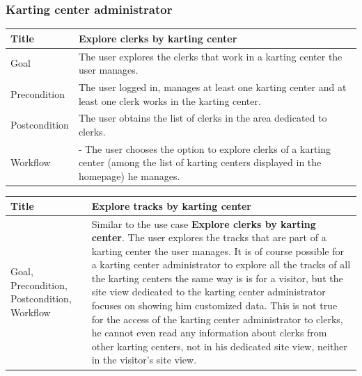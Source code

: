 \documentclass{beamer}
\begin{document}
\begin{frame}
    \frametitle{Karting center administrator}
    \begin{table}
        \tiny
        \begin{tabular}{|p{2cm}|p{6cm}|}
        \hline  
        Title & \textbf{Explore clerks by karting center} \\
        \hline
        Goal & The user explores the clerks that work in a karting center the user manages. \\
        \hline
        Precondition & The user logged in, manages at least one karting center and at least one clerk
        works in the karting center.\\
        \hline
        Postcondition & The user obtains the list of clerks in the area dedicated to clerks. \\
        \hline
        Workflow &
        - The user chooses the option to explore clerks of a karting center 
        (among the list of karting centers displayed in the homepage) he manages. \\
        \hline
        \end{tabular}
\end{table}

\begin{table}
    \tiny
    \begin{tabular}{|p{2cm}|p{6cm}|}
    \hline  
    Title & \textbf{Explore tracks by karting center} \\
    \hline
    Goal, Precondition, Postcondition, Workflow & Similar to the use case \textbf{Explore clerks by karting center}.
    The user explores the tracks that are part of a karting center the user manages. It is of course
    possible for a karting center administrator to explore all the tracks of all the karting centers
    the same way is is for a visitor, but the site view dedicated to the karting center administrator
    focuses on showing him customized data. This is not true for the access of the karting center administrator 
    to clerks, he cannot even read any information about clerks from other karting centers, not in his dedicated 
    site view, neither in the visitor's site view.\\
    \hline
    \end{tabular}
\end{table}
\end{frame}
\end{document}
